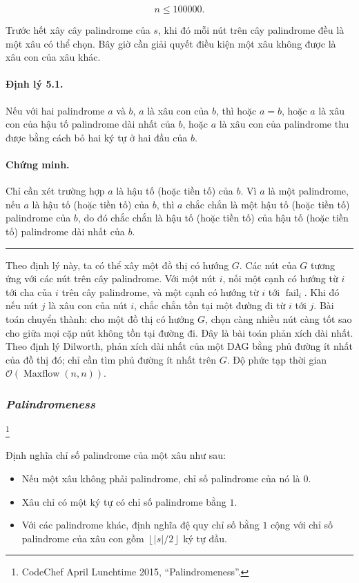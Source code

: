 \documentclass[11pt]{article}
\newcommand{\Oh}{\mathcal{O}}
\newcommand{\qedmark}{\hfill\rule{0.7ex}{0.7ex}}
\begin{document}
\[
n\le 100000.
\]

Trước hết xây cây palindrome của \(s\), khi đó mỗi nút trên cây palindrome đều
là một xâu có thể chọn. Bây giờ cần giải quyết điều kiện một xâu không được là
xâu con của xâu khác.

\paragraph{Định lý 5.1.}
Nếu với hai palindrome \(a\) và \(b\), \(a\) là xâu con của \(b\), thì hoặc
\(a=b\), hoặc \(a\) là xâu con của hậu tố palindrome dài nhất của \(b\), hoặc
\(a\) là xâu con của palindrome thu được bằng cách bỏ hai ký tự ở hai đầu của
\(b\).

\paragraph{Chứng minh.}
Chỉ cần xét trường hợp \(a\) là hậu tố (hoặc tiền tố) của \(b\). Vì \(a\) là
một palindrome, nếu \(a\) là hậu tố (hoặc tiền tố) của \(b\), thì \(a\) chắc
chắn là một hậu tố (hoặc tiền tố) palindrome của \(b\), do đó chắc chắn là hậu
tố (hoặc tiền tố) của hậu tố (hoặc tiền tố) palindrome dài nhất của \(b\).
\qedmark

Theo định lý này, ta có thể xây một đồ thị có hướng \(G\). Các nút của \(G\)
tương ứng với các nút trên cây palindrome. Với một nút \(i\), nối một cạnh có
hướng từ \(i\) tới cha của \(i\) trên cây palindrome, và một cạnh có hướng từ
\(i\) tới \(\operatorname{fail}_i\). Khi đó nếu nút \(j\) là xâu con của nút
\(i\), chắc chắn tồn tại một đường đi từ \(i\) tới \(j\). Bài toán chuyển
thành: cho một đồ thị có hướng \(G\), chọn càng nhiều nút càng tốt sao cho
giữa mọi cặp nút không tồn tại đường đi. Đây là bài toán phản xích dài nhất.
Theo định lý Dilworth, phản xích dài nhất của một DAG bằng phủ đường ít nhất
của đồ thị đó; chỉ cần tìm phủ đường ít nhất trên \(G\). Độ phức tạp thời gian
\(\Oh(\operatorname{Maxflow}(n,n))\).

\subsubsection{\emph{Palindromeness}}
\footnote{CodeChef April Lunchtime 2015, ``Palindromeness''.}

Định nghĩa chỉ số palindrome của một xâu như sau:

\begin{itemize}
  \item Nếu một xâu không phải palindrome, chỉ số palindrome của nó là \(0\).
  \item Xâu chỉ có một ký tự có chỉ số palindrome bằng \(1\).
  \item Với các palindrome khác, định nghĩa đệ quy chỉ số bằng \(1\) cộng với
  chỉ số palindrome của xâu con gồm \(\left\lfloor |s|/2\right\rfloor\) ký tự
  đầu.
\end{itemize}
\end{document}

